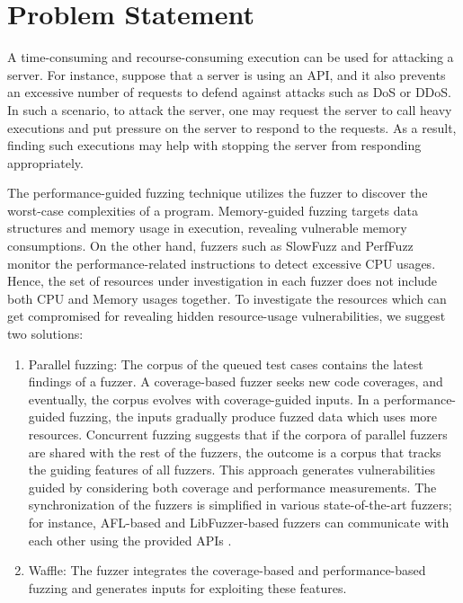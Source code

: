 \section{Problem Statement}

A time-consuming and recourse-consuming execution can be used for attacking a server. For instance, suppose that a server is using an API, and it also prevents an excessive number of requests to defend against attacks such as DoS or DDoS. In such a scenario, to attack the server, one may request the server to call heavy executions and put pressure on the server to respond to the requests. As a result, finding such executions may help with stopping the server from responding appropriately.

The performance-guided fuzzing technique utilizes the fuzzer to discover the worst-case complexities of a program. Memory-guided fuzzing targets data structures and memory usage in execution, revealing vulnerable memory consumptions. On the other hand, fuzzers such as SlowFuzz and PerfFuzz monitor the performance-related instructions to detect excessive CPU usages. Hence, the set of resources under investigation in each fuzzer does not include both CPU and Memory usages together. To investigate the resources which can get compromised for revealing hidden resource-usage vulnerabilities, we suggest two solutions:

\begin{enumerate}
    \item Parallel fuzzing: The corpus of the queued test cases contains the latest findings of a fuzzer. A coverage-based fuzzer seeks new code coverages, and eventually, the corpus evolves with coverage-guided inputs. In a performance-guided fuzzing, the inputs gradually produce fuzzed data which uses more resources. Concurrent fuzzing suggests that if the corpora of parallel fuzzers are shared with the rest of the fuzzers, the outcome is a corpus that tracks the guiding features of all fuzzers. This approach generates vulnerabilities guided by considering both coverage and performance measurements. The synchronization of the fuzzers is simplified in various state-of-the-art fuzzers; for instance, AFL-based and LibFuzzer-based fuzzers can communicate with each other using the provided APIs \cite{afl_par}.
    
    \item Waffle: The fuzzer integrates the coverage-based and performance-based fuzzing and generates inputs for exploiting these features.
\end{enumerate}
